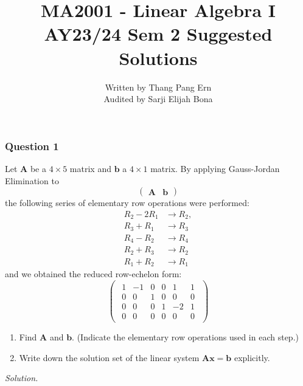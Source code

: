 \documentclass[12pt]{article}
\title{MA2001 - Linear Algebra I \\ AY23/24 Sem 2 Suggested Solutions}
\author{Written by Thang Pang Ern \\ Audited by Sarji Elijah Bona}
\begin{document}
\maketitle\subsubsection*{Question 1}
Let \( \mathbf{A} \) be a \( 4 \times 5 \) matrix and \( \mathbf{b} \) a \( 4 \times 1 \) matrix. By applying Gauss-Jordan Elimination to 
\[
\left(\begin{array}{c|c}
\mathbf{A} & \mathbf{b}
\end{array}\right)
\]
the following series of elementary row operations were performed:
\begin{align*}
  R_2 - 2R_1&\to R_2, \\
  R_3 + R_1 &\to R_3\\
  R_4 - R_2&\to R_4 \\
 R_2 + R_3 &\to R_2 \\
 R_1 + R_2 &\to R_1 
\end{align*}
and we obtained the reduced row-echelon form:
\[
\begin{pmatrix}
\begin{array}{ccccc|c}
1 & -1 & 0 & 0 & 1 & 1 \\
0 &  0 & 1 & 0 & 0 & 0 \\
0 &  0 & 0 & 1 & -2 & 1 \\
0 &  0 & 0 & 0 &  0 & 0
\end{array}
\end{pmatrix}
\]
\begin{enumerate}[label=\textbf{(\alph*)}]
\itemsep 0em
    \item Find \( \mathbf{A} \) and \( \mathbf{b} \). (Indicate the elementary row operations used in each step.) 
    \item Write down the solution set of the linear system \( \mathbf{Ax}=\mathbf{b} \) explicitly.
\end{enumerate} 
\newpage
\noindent \textit{Solution.}
\end{document}
